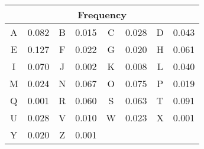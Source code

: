 \documentclass[12pt]{article}
\begin{document}
\begin{enumerate}[(a)]
\begin{table}[H]
\begin{tabular}{|cc|cc|cc|cc|}
        \hline
        \multicolumn{8}{|c|}{Frequency}               \\ \hline
        A & 0.082 & B & 0.015 & C & 0.028 & D & 0.043 \\ \hline
        E & 0.127 & F & 0.022 & G & 0.020 & H & 0.061 \\ \hline
        I & 0.070 & J & 0.002 & K & 0.008 & L & 0.040 \\ \hline
        M & 0.024 & N & 0.067 & O & 0.075 & P & 0.019 \\ \hline
        Q & 0.001 & R & 0.060 & S & 0.063 & T & 0.091 \\ \hline
        U & 0.028 & V & 0.010 & W & 0.023 & X & 0.001 \\ \hline
        Y & 0.020 & Z & 0.001 & \multicolumn{4}{c|}{} \\ \hline
        \end{tabular}
        \end{table}
\end{enumerate}
\end{document}
